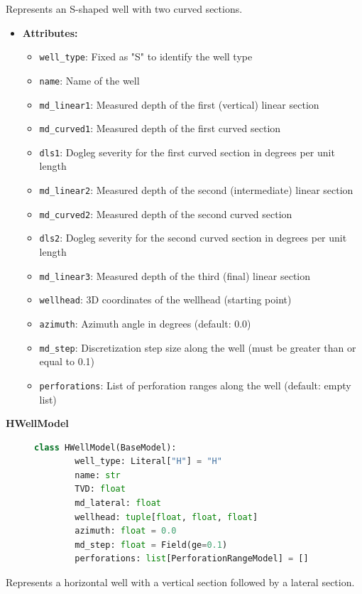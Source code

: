 Represents an S-shaped well with two curved sections.

\begin{itemize}
	\item \textbf{Attributes:}
	\begin{itemize}
		\item \texttt{well\_type}: Fixed as "S" to identify the well type
		\item \texttt{name}: Name of the well
		\item \texttt{md\_linear1}: Measured depth of the first (vertical) linear section
		\item \texttt{md\_curved1}: Measured depth of the first curved section
		\item \texttt{dls1}: Dogleg severity for the first curved section in degrees per unit length
		\item \texttt{md\_linear2}: Measured depth of the second (intermediate) linear section
		\item \texttt{md\_curved2}: Measured depth of the second curved section
		\item \texttt{dls2}: Dogleg severity for the second curved section in degrees per unit length
		\item \texttt{md\_linear3}: Measured depth of the third (final) linear section
		\item \texttt{wellhead}: 3D coordinates of the wellhead (starting point)
		\item \texttt{azimuth}: Azimuth angle in degrees (default: 0.0)
		\item \texttt{md\_step}: Discretization step size along the well (must be greater than or equal to 0.1)
		\item \texttt{perforations}: List of perforation ranges along the well (default: empty list)
	\end{itemize}
\end{itemize}

\textbf{HWellModel}
\begin{figure}[H]
	\begin{lstlisting}[language=Python, caption=HWellModel class definition]
		class HWellModel(BaseModel):
		well_type: Literal["H"] = "H"
		name: str
		TVD: float
		md_lateral: float
		wellhead: tuple[float, float, float]
		azimuth: float = 0.0
		md_step: float = Field(ge=0.1)
		perforations: list[PerforationRangeModel] = []
	\end{lstlisting}
\end{figure}

Represents a horizontal well with a vertical section followed by a lateral section.

